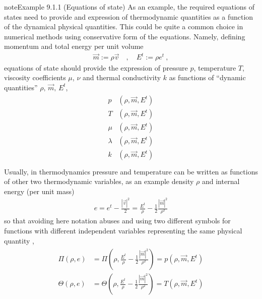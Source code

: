 \documentclass[letterpaper,10pt,english]{jupyterBook}
\begin{document}
\begin{sphinxadmonition}{note}{Example 9.1.1 (Equations of state)}
\sphinxAtStartPar
As an example, the required equations of states need to provide and expression of thermodynamic quantities as a function of the dynamical physical quantities. This could be quite a common choice in numerical methods using conservative form of the equations. Namely, defining momentum and total energy per unit volume
\begin{equation*}
\begin{split}\vec{m} := \rho \vec{v} \quad , \quad E^t := \rho e^t \ ,\end{split}
\end{equation*}
\sphinxAtStartPar
equations of state should provide the expression of pressure \(p\), temperature \(T\), viscosity coefficients \(\mu\), \(\nu\) and thermal conductivity \(k\) as functions of “dynamic quantities” \(\rho, \, \vec{m}, \, E^t\),
\begin{equation*}
\begin{split}\begin{aligned}
        p & (\rho, \vec{m}, E^t) \\
        T & (\rho, \vec{m}, E^t) \\
      \mu & (\rho, \vec{m}, E^t) \\
  \lambda & (\rho, \vec{m}, E^t) \\
        k & (\rho, \vec{m}, E^t) \\
\end{aligned}\end{split}
\end{equation*}
\sphinxAtStartPar
Usually, in thermodynamics pressure and temperature can be written as functions of other two thermodynamic variables, as an example density \(\rho\) and internal energy (per unit mass)
\begin{equation*}
\begin{split}e = e^t - \frac{|\vec{v}|^2}{2} = \frac{E^t}{\rho} - \frac{1}{2}\frac{|\vec{m}|^2}{\rho^2}\end{split}
\end{equation*}
\sphinxAtStartPar
so that \sphinxhyphen{} avoiding here notation abuses and using two different symbols for functions with different independent variables representing the same physical quantity \sphinxhyphen{},
\begin{equation*}
\begin{split}\begin{aligned}
  \Pi   \left( \rho, e \right) & = \Pi   \left( \rho, \frac{E^t}{\rho} - \frac{1}{2}\frac{|\vec{m}|^2}{\rho^2} \right) = p(\rho, \vec{m}, E^t) \\
  \Theta\left( \rho, e \right) & = \Theta\left( \rho, \frac{E^t}{\rho} - \frac{1}{2}\frac{|\vec{m}|^2}{\rho^2} \right) = T(\rho, \vec{m}, E^t) \\
\end{aligned}\end{split}
\end{equation*}\end{sphinxadmonition}
\end{document}

